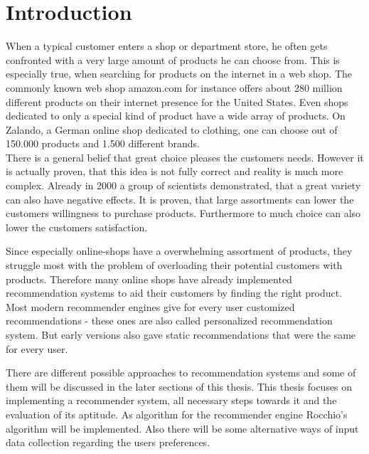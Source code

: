 
\section{Introduction}



When a typical customer enters a shop or department store, he often gets confronted with a very large amount of products he can choose from.
This is especially true, when searching for products on the internet in a web shop.
The commonly known web shop amazon.com for instance offers about 280 million different products on their internet presence for the United States.\citep{marketplaceanalytics:2014}
Even shops dedicated to only a special kind of product have a wide array of products.
On Zalando, a German online shop dedicated to clothing, one can choose out of 150.000 products and 1.500 different brands.\citep{visser:2014}\\
There is a general belief that great choice pleases the customers needs.
However it is actually proven, that this idea is not fully correct and reality is much more complex.
Already in 2000 a group of scientists demonstrated, that a great variety can also have negative effects.\citep[312]{diehl:2010}
It is proven, that large assortments can lower the customers willingness to purchase products.\citep[313]{diehl:2010}
Furthermore to much choice can also lower the customers satisfaction.\citep[320]{diehl:2010}


Since especially online-shops have a overwhelming assortment of products, they struggle most with the problem of overloading their potential customers with products.
Therefore many online shops have already implemented recommendation systems to aid their customers by finding the right product.
Most modern recommender engines give for every user customized recommendations - these ones are also called personalized recommendation system.
But early versions also gave static recommendations that were the same for every user.\citep[1-2]{ricci:2011}


There are different possible approaches to recommendation systems and some of them will be discussed in the later sections of this thesis.
This thesis focuses on implementing a recommender system, all necessary steps towards it and the evaluation of its aptitude.
As algorithm for the recommender engine Rocchio's algorithm will be implemented.
Also there will be some alternative ways of input data collection regarding the users preferences.






